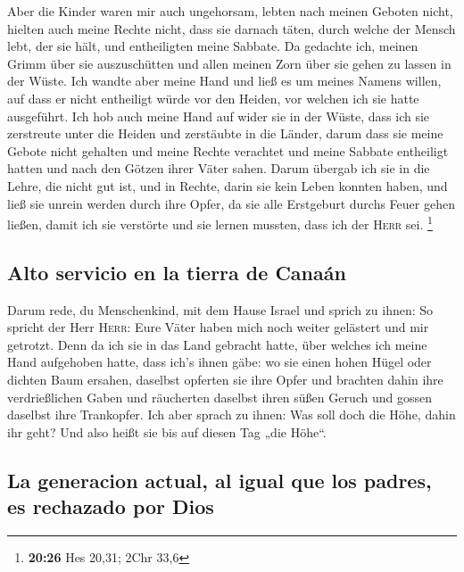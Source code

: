  Aber die Kinder waren mir auch ungehorsam, lebten nach
meinen Geboten nicht, hielten auch meine Rechte nicht, dass sie darnach
täten, durch welche der Mensch lebt, der sie hält, und entheiligten
meine Sabbate. Da gedachte ich, meinen Grimm über sie auszuschütten und
allen meinen Zorn über sie gehen zu lassen in der Wüste. 
Ich wandte aber meine Hand und ließ es um meines Namens willen, auf dass
er nicht entheiligt würde vor den Heiden, vor welchen ich sie hatte
ausgeführt.  Ich hob auch meine Hand auf wider sie in der
Wüste, dass ich sie zerstreute unter die Heiden und zerstäubte in die
Länder,  darum dass sie meine Gebote nicht gehalten und
meine Rechte verachtet und meine Sabbate entheiligt hatten und nach den
Götzen ihrer Väter sahen.  Darum übergab ich sie in die
Lehre, die nicht gut ist, und in Rechte, darin sie kein Leben konnten
haben,  und ließ sie unrein werden durch ihre Opfer, da
sie alle Erstgeburt durchs Feuer gehen ließen, damit ich sie verstörte
und sie lernen mussten, dass ich der \textsc{Herr} sei. \footnote{\textbf{20:26}
  Hes 20,31; 2Chr 33,6}

\hypertarget{alto-servicio-en-la-tierra-de-canauxe1n}{%
\subsection{Alto servicio en la tierra de
Canaán}\label{alto-servicio-en-la-tierra-de-canauxe1n}}

 Darum rede, du Menschenkind, mit dem Hause Israel und
sprich zu ihnen: So spricht der Herr \textsc{Herr}: Eure Väter haben
mich noch weiter gelästert und mir getrotzt.  Denn da ich
sie in das Land gebracht hatte, über welches ich meine Hand aufgehoben
hatte, dass ich's ihnen gäbe: wo sie einen hohen Hügel oder dichten Baum
ersahen, daselbst opferten sie ihre Opfer und brachten dahin ihre
verdrießlichen Gaben und räucherten daselbst ihren süßen Geruch und
gossen daselbst ihre Trankopfer.  Ich aber sprach zu
ihnen: Was soll doch die Höhe, dahin ihr geht? Und also heißt sie bis
auf diesen Tag „die Höhe``.

\hypertarget{la-generacion-actual-al-igual-que-los-padres-es-rechazado-por-dios}{%
\subsection{La generacion actual, al igual que los padres, es rechazado
por
Dios}\label{la-generacion-actual-al-igual-que-los-padres-es-rechazado-por-dios}}

